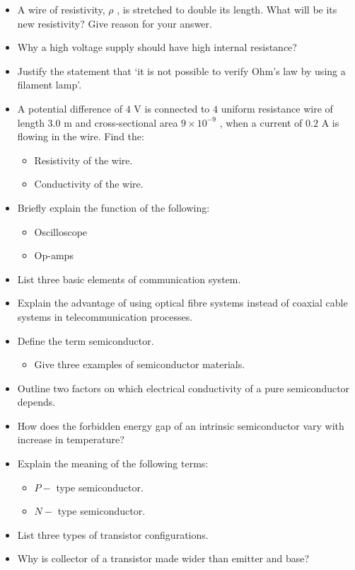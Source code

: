 \documentclass{article}
\begin{document}
\begin{itemize}
\item A wire of resistivity, $ \rho $ , is stretched to double its length. What will be its new resistivity? Give reason for your answer. 
\item Why a high voltage supply should have high internal resistance?
\item Justify the statement that ‘it is not possible to verify Ohm's law by using a filament lamp’.
\item A potential difference of $ 4$ V is connected to $ 4$ uniform resistance wire of length $ 3.0$ m and cross-sectional area $ 9\times 10^{-9}$ , when a current of $ 0.2$ A is flowing in the wire. Find the:
 \begin{itemize}
\item Resistivity of the wire.
\item Conductivity of the wire. 
\end{itemize}
\item Briefly explain the function of the following:
 \begin{itemize}
\item Oscilloscope
\item Op-amps
\end{itemize}
\item List three basic elements of communication system. 
\item Explain the advantage of using optical fibre systems instead of coaxial cable systems in telecommunication processes.
\item Define the term semiconductor.
 \begin{itemize}
\item Give three examples of semiconductor materials. 
\end{itemize}
\item Outline two factors on which electrical conductivity of a pure semiconductor depends. 
\item How does the forbidden energy gap of an intrinsic semiconductor vary with increase in temperature? 
\item Explain the meaning of the following terms:
 \begin{itemize}
\item $ P-$ type semiconductor.
\item $ N-$ type semiconductor. 
\end{itemize}
\item List three types of transistor configurations.
\item Why is collector of a transistor made wider than emitter and base? 

\end{itemize}
\end{document}
